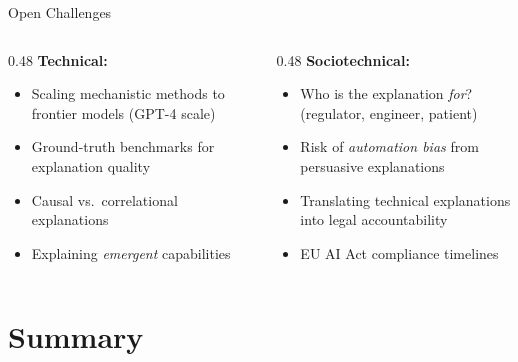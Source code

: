 \documentclass[aspectratio=169]{beamer}
\begin{document}
\begin{frame}{Open Challenges}
  \begin{columns}[T]
    \begin{column}{0.48\textwidth}
      \textbf{Technical:}
      \begin{itemize}
        \item Scaling mechanistic methods to frontier models (GPT-4 scale)
        \item Ground-truth benchmarks for explanation quality
        \item Causal vs.\ correlational explanations
        \item Explaining \emph{emergent} capabilities
      \end{itemize}
    \end{column}
    \begin{column}{0.48\textwidth}
      \textbf{Sociotechnical:}
      \begin{itemize}
        \item Who is the explanation \emph{for}? (regulator, engineer, patient)
        \item Risk of \emph{automation bias} from persuasive explanations
        \item Translating technical explanations into legal accountability
        \item EU AI Act compliance timelines
      \end{itemize}
    \end{column}
  \end{columns}
\end{frame}

\section{Summary}
\end{document}
